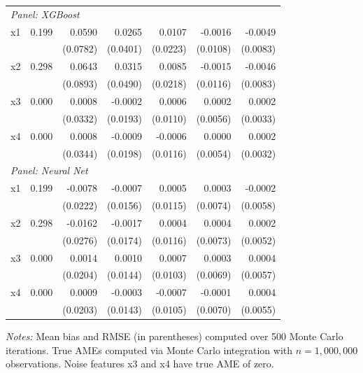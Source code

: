 \documentclass[12pt]{article}
\begin{document}
\begin{table}[htbp]
\begin{threeparttable}
\begin{tabular}{lrrrrrr}
				\multicolumn{7}{l}{\textit{Panel: XGBoost}} \\
				\quad x1 & 0.199 & 0.0590 & 0.0265 & 0.0107 & -0.0016 & -0.0049 \\
				&  & (0.0782) & (0.0401) & (0.0223) & (0.0108) & (0.0083) \\
				\quad x2 & 0.298 & 0.0643 & 0.0315 & 0.0085 & -0.0015 & -0.0046 \\
				&  & (0.0893) & (0.0490) & (0.0218) & (0.0116) & (0.0083) \\
				\quad x3 & 0.000 & 0.0008 & -0.0002 & 0.0006 & 0.0002 & 0.0002 \\
				&  & (0.0332) & (0.0193) & (0.0110) & (0.0056) & (0.0033) \\
				\quad x4 & 0.000 & 0.0008 & -0.0009 & -0.0006 & 0.0000 & 0.0002 \\
				&  & (0.0344) & (0.0198) & (0.0116) & (0.0054) & (0.0032) \\
				\midrule
				\multicolumn{7}{l}{\textit{Panel: Neural Net}} \\
				\quad x1 & 0.199 & -0.0078 & -0.0007 & 0.0005 & 0.0003 & -0.0002 \\
				&  & (0.0222) & (0.0156) & (0.0115) & (0.0074) & (0.0058) \\
				\quad x2 & 0.298 & -0.0162 & -0.0017 & 0.0004 & 0.0004 & 0.0002 \\
				&  & (0.0276) & (0.0174) & (0.0116) & (0.0073) & (0.0052) \\
				\quad x3 & 0.000 & 0.0014 & 0.0010 & 0.0007 & 0.0003 & 0.0004 \\
				&  & (0.0204) & (0.0144) & (0.0103) & (0.0069) & (0.0057) \\
				\quad x4 & 0.000 & 0.0009 & -0.0003 & -0.0007 & -0.0001 & 0.0004 \\
				&  & (0.0203) & (0.0143) & (0.0105) & (0.0070) & (0.0055) \\
				\bottomrule
				\end{tabular}
				\begin{tablenotes}
				\footnotesize
				\item \textit{Notes:} Mean bias and RMSE (in parentheses) computed over 500 Monte Carlo iterations. True AMEs computed via Monte Carlo integration with $n=1{,}000{,}000$ observations. Noise features x3 and x4 have true AME of zero.
				\end{tablenotes}
		\end{threeparttable}
	\end{table}
	
\end{document}
